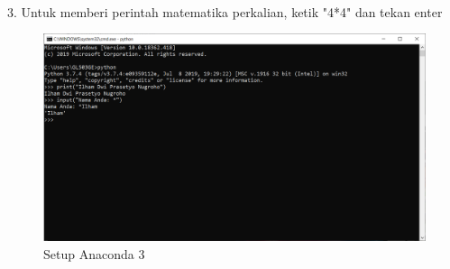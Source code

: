 \documentclass{article}
\begin{document}
\\
\\
\\
\\
\\
\\
\\
\\
\\
\\
\\
\\
\\
\\
\\
\\
\\
\\
\\
\\
\\
\\
\\

3. Untuk memberi perintah matematika perkalian, ketik "4*4" dan tekan enter
\begin{figure}[h]
	\centering
		\includegraphics[scale=0.5]{Gambar/C3.PNG}
		\caption{Setup Anaconda 3}
\end{figure}
\\
\\
\\
\\
\\
\\
\\
\\
\\
\\
\\
\\
\\
\\
\\
\\
\\
\\
\\
\\
\\
\\
\\
\\
\\
\\
\end{document}
